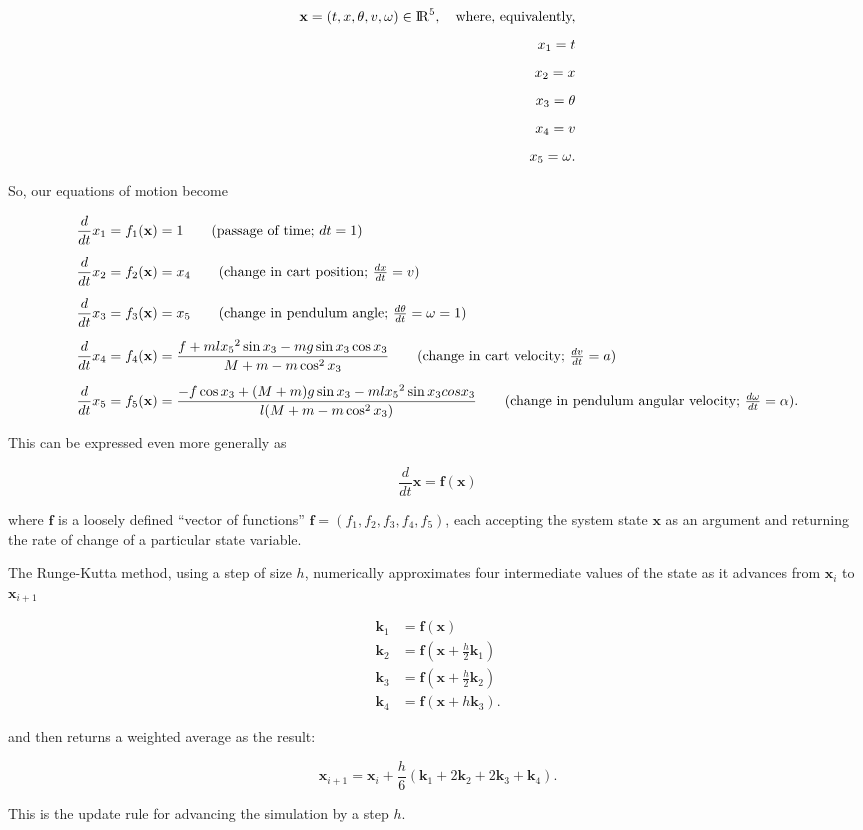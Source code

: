 \documentclass[12pt]{article}
\begin{document}
\begin{align}
\mathbf{x} = (t, x, \theta, v, \omega) \in {\rm I\!R}^5, \quad \mbox{where, equivalently,} \\[5pt]
x_1 = t \nonumber\\[5pt]
x_2 = x \nonumber\\[5pt]
x_3 = \theta \nonumber\\[5pt]
x_4 = v \nonumber\\[5pt]
x_5 = \omega \nonumber.
\end{align}

So, our equations of motion become

\begin{align}
\frac{d}{dt} x_1 &= f_1(\mathbf{x}) = 1 \tag*{(passage of time; $dt = 1$)} \nonumber\\[5pt]
\frac{d}{dt} x_2 &= f_2(\mathbf{x}) = x_4 \tag*{(change in cart position; $\frac{dx}{dt} = v$)} \\[5pt]
\frac{d}{dt} x_3 &= f_3(\mathbf{x}) = x_5 \tag*{(change in pendulum angle; $\frac{d\theta}{dt} = \omega = 1$)} \\[5pt]
\frac{d}{dt} x_4 &= f_4(\mathbf{x}) = \frac{f + m l {x_5}^2 \sin{x_3} - m g \sin{x_3} \cos{x_3}}{M + m - m \cos^2{x_3}} \tag*{(change in cart velocity; $\frac{dv}{dt} = a$)} \\[5pt]
\frac{d}{dt} x_5 &= f_5(\mathbf{x}) = \frac{-f \cos{x_3} + (M + m) g \sin{x_3} - m l {x_5}^2 \sin{x_3} cos{x_3}}{l (M + m - m \cos^2{x_3})} \tag*{(change in pendulum angular velocity; $\frac{d\omega}{dt} = \alpha$).}
\end{align}

This can be expressed even more generally as

\begin{equation}
\frac{d}{dt} \mathbf{x} = \mathbf{f}(\mathbf{x})
\end{equation}

where $\mathbf{f}$ is a loosely defined ``vector of functions'' $\mathbf{f} = (f_1, f_2, f_3, f_4, f_5)$, each accepting the system state $\mathbf{x}$ as an argument and returning the rate of change of a particular state variable.

The Runge-Kutta method, using a step of size $h$, numerically approximates four intermediate values of the state as it advances from $\mathbf{x}_i$ to $\mathbf{x}_{i+1}$

\begin{align}
\mathbf{k}_1 &= \mathbf{f}(\mathbf{x}) \\[5pt]
\mathbf{k}_2 &= \mathbf{f}(\mathbf{x} + \frac{h}{2} \mathbf{k}_1) \\[5pt]
\mathbf{k}_3 &= \mathbf{f}(\mathbf{x} + \frac{h}{2} \mathbf{k}_2) \\[5pt]
\mathbf{k}_4 &= \mathbf{f}(\mathbf{x} + h \mathbf{k}_3).
\end{align}

and then returns a weighted average as the result:

\begin{equation}
\mathbf{x}_{i+1} = \mathbf{x}_i + \frac{h}{6}(\mathbf{k}_1 + 2 \mathbf{k}_2 + 2 \mathbf{k}_3 + \mathbf{k}_4).
\end{equation}

This is the update rule for advancing the simulation by a step $h$.
\end{document}
